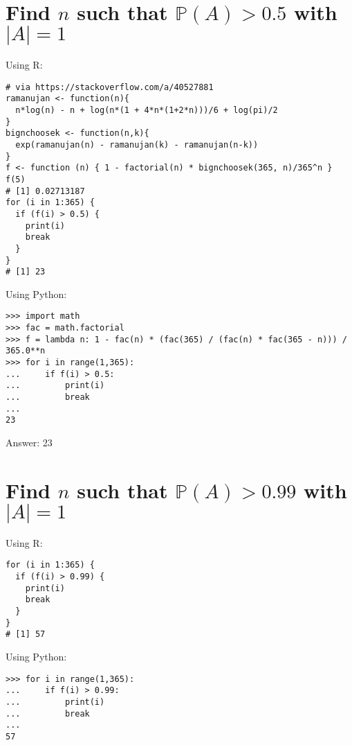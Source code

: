 \documentclass{article}
\begin{document}
\section{Find $n$ such that $\mathbb P(A) > 0.5$ with $|A| = 1$}

Using R:

\begin{verbatim}
# via https://stackoverflow.com/a/40527881
ramanujan <- function(n){
  n*log(n) - n + log(n*(1 + 4*n*(1+2*n)))/6 + log(pi)/2
}
bignchoosek <- function(n,k){
  exp(ramanujan(n) - ramanujan(k) - ramanujan(n-k))
}
f <- function (n) { 1 - factorial(n) * bignchoosek(365, n)/365^n }
f(5)
# [1] 0.02713187
for (i in 1:365) {
  if (f(i) > 0.5) {
    print(i)
    break
  }
}
# [1] 23
\end{verbatim}

Using Python:

\begin{verbatim}
>>> import math
>>> fac = math.factorial
>>> f = lambda n: 1 - fac(n) * (fac(365) / (fac(n) * fac(365 - n))) / 365.0**n
>>> for i in range(1,365):
...     if f(i) > 0.5:
...         print(i)
...         break
... 
23
\end{verbatim}

Answer: 23

\section{Find $n$ such that $\mathbb P(A) > 0.99$ with $|A| = 1$}

Using R:

\begin{verbatim}
for (i in 1:365) {
  if (f(i) > 0.99) {
    print(i)
    break
  }
}
# [1] 57
\end{verbatim}

Using Python:

\begin{verbatim}
>>> for i in range(1,365):
...     if f(i) > 0.99:
...         print(i)
...         break
... 
57
\end{verbatim}
\end{document}
